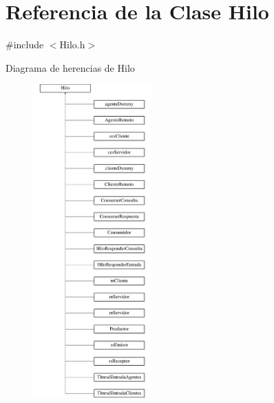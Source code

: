 \hypertarget{classHilo}{\section{\-Referencia de la \-Clase \-Hilo}
\label{classHilo}
}


{\ttfamily \#include $<$\-Hilo.\-h$>$}

\-Diagrama de herencias de \-Hilo\begin{figure}[H]
\begin{center}
\leavevmode
\includegraphics[height=12.000000cm]{classHilo}
\end{center}
\end{figure}
